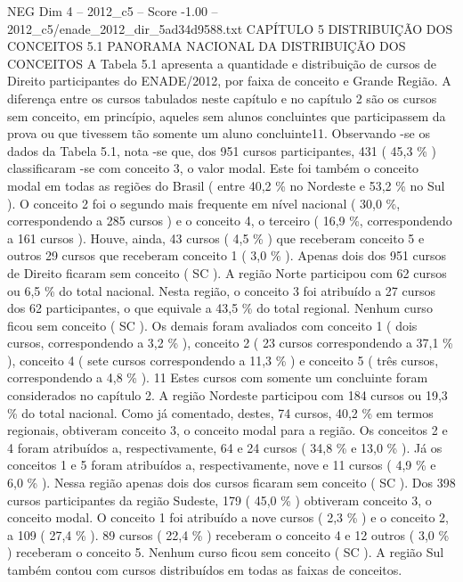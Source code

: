 \begin{textsample}{NEG Dim 4 – 2012\_c5 – Score -1.00 – 2012\_c5/enade\_2012\_dir\_5ad34d9588.txt}  \label{ex:f4_neg_109}
CAPÍTULO 5 DISTRIBUIÇÃO DOS CONCEITOS 5.1 PANORAMA NACIONAL DA DISTRIBUIÇÃO DOS CONCEITOS A Tabela 5.1 apresenta a quantidade e distribuição de cursos de Direito participantes do ENADE/2012, por faixa de conceito e Grande Região.
A diferença entre os cursos tabulados neste capítulo e no capítulo 2 são os cursos sem conceito, em princípio, aqueles sem alunos concluintes que participassem da prova ou que tivessem tão somente um aluno concluinte11.
Observando -se os dados da Tabela 5.1, nota -se que, dos 951 cursos participantes, 431 ( 45,3 \% ) classificaram -se com conceito 3, o valor modal.
Este foi também o conceito modal em todas as regiões do Brasil ( entre 40,2 \% no Nordeste e 53,2 \% no Sul ).
O conceito 2 foi o segundo mais frequente em nível nacional ( 30,0 \%, correspondendo a 285 cursos ) e o conceito 4, o terceiro ( 16,9 \%, correspondendo a 161 cursos ).
Houve, ainda, 43 cursos ( 4,5 \% ) que receberam conceito 5 e outros 29 cursos que receberam conceito 1 ( 3,0 \% ).
Apenas dois dos 951 cursos de Direito ficaram sem conceito ( SC ).
A região Norte participou com 62 cursos ou 6,5 \% do total nacional.
Nesta região, o conceito 3 foi atribuído a 27 cursos dos 62 participantes, o que equivale a 43,5 \% do total regional.
Nenhum curso ficou sem conceito ( SC ).
Os demais foram avaliados com conceito 1 ( dois cursos, correspondendo a 3,2 \% ), conceito 2 ( 23 cursos correspondendo a 37,1 \% ), conceito 4 ( sete cursos correspondendo a 11,3 \% ) e conceito 5 ( três cursos, correspondendo a 4,8 \% ). 11 Estes cursos com somente um concluinte foram considerados no capítulo 2.
A região Nordeste participou com 184 cursos ou 19,3 \% do total nacional.
Como já comentado, destes, 74 cursos, 40,2 \% em termos regionais, obtiveram conceito 3, o conceito modal para a região.
Os conceitos 2 e 4 foram atribuídos a, respectivamente, 64 e 24 cursos ( 34,8 \% e 13,0 \% ).
Já os conceitos 1 e 5 foram atribuídos a, respectivamente, nove e 11 cursos ( 4,9 \% e 6,0 \% ).
Nessa região apenas dois dos cursos ficaram sem conceito ( SC ).
Dos 398 cursos participantes da região Sudeste, 179 ( 45,0 \% ) obtiveram conceito 3, o conceito modal.
O conceito 1 foi atribuído a nove cursos ( 2,3 \% ) e o conceito 2, a 109 ( 27,4 \% ). 89 cursos ( 22,4 \% ) receberam o conceito 4 e 12 outros ( 3,0 \% ) receberam o conceito 5.
Nenhum curso ficou sem conceito ( SC ).
A região Sul também contou com cursos distribuídos em todas as faixas de conceitos.

\end{textsample}
